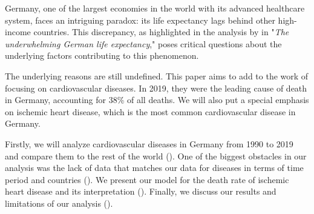
Germany, one of the largest economies in the world with its advanced healthcare 
system, faces an intriguing paradox: its life expectancy lags behind other 
high-income countries. This discrepancy, as highlighted in the analysis by 
\citet{Jasilionis2023} in "\textit{The underwhelming German life expectancy}," 
poses critical questions about the underlying factors contributing to this 
phenomenon.

The underlying reasons are still undefined. This paper aims to add to 
the work of \citet{Jasilionis2023} focusing on cardiovascular diseases. In 2019,
they were the leading cause of death in Germany, accounting for 38\% of all deaths. 
We will also put a special emphasis on ischemic heart disease, which is the
most common cardiovascular disease in Germany.


Firstly, we will analyze cardiovascular diseases in Germany from 1990 to 2019 
and compare them to the rest of the world (). One of the 
biggest obstacles in our analysis was the lack of data that matches our data for 
diseases in terms of time period and countries (). We present 
our model for the death rate of ischemic heart disease and its interpretation 
(). Finally, we discuss our results and limitations of our analysis 
().
